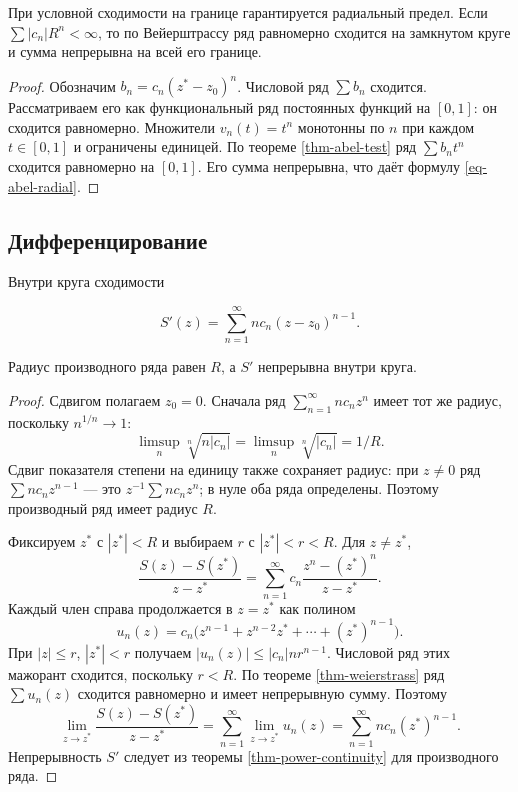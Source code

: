 При условной сходимости на границе гарантируется радиальный предел. Если \(\sum|c_n|R^n<\infty\), то по Вейерштрассу ряд равномерно сходится на замкнутом круге и сумма непрерывна на всей его границе.

\begin{proof}

Обозначим \(b_n=c_n(z^*-z_0)^n\). Числовой ряд \(\sum b_n\) сходится. Рассматриваем его как функциональный ряд постоянных функций на \([0,1]\): он сходится равномерно. Множители \(v_n(t)=t^n\) монотонны по \(n\) при каждом \(t\in[0,1]\) и ограничены единицей. По теореме \ref{thm-abel-test} ряд \(\sum b_nt^n\) сходится равномерно на \([0,1]\). Его сумма непрерывна, что даёт формулу \eqref{eq-abel-radial}.

\end{proof}

\subsection{Дифференцирование}\label{sec-power-series-03-1}

\begin{theorem}\label{thm-power-derivative}

Внутри круга сходимости

\begin{equation}
S'(z)=\sum_{n=1}^\infty nc_n(z-z_0)^{n-1}.
\label{eq-power-derivative}
\end{equation}

Радиус производного ряда равен \(R\), а \(S'\) непрерывна внутри круга.

\end{theorem}

\begin{proof}

Сдвигом полагаем \(z_0=0\). Сначала ряд \(\sum_{n=1}^\infty nc_nz^n\) имеет тот же радиус, поскольку \(n^{1/n}\to1\): \[
\limsup_n\sqrt[n]{n|c_n|}=\limsup_n\sqrt[n]{|c_n|}=1/R.
\] Сдвиг показателя степени на единицу также сохраняет радиус: при \(z\ne0\) ряд \(\sum nc_nz^{n-1}\) --- это \(z^{-1}\sum nc_nz^n\); в нуле оба ряда определены. Поэтому производный ряд имеет радиус \(R\).

Фиксируем \(z^*\) с \(|z^*|<R\) и выбираем \(r\) с \(|z^*|<r<R\). Для \(z\ne z^*\), \[
\frac{S(z)-S(z^*)}{z-z^*}
=\sum_{n=1}^\infty c_n\frac{z^n-(z^*)^n}{z-z^*}.
\] Каждый член справа продолжается в \(z=z^*\) как полином \[
u_n(z)=c_n\bigl(z^{n-1}+z^{n-2}z^*+\cdots+(z^*)^{n-1}\bigr).
\] При \(|z|\le r\), \(|z^*|<r\) получаем \(|u_n(z)|\le|c_n|nr^{n-1}\). Числовой ряд этих мажорант сходится, поскольку \(r<R\). По теореме \ref{thm-weierstrass} ряд \(\sum u_n(z)\) сходится равномерно и имеет непрерывную сумму. Поэтому \[
\lim_{z\to z^*}\frac{S(z)-S(z^*)}{z-z^*}
=\sum_{n=1}^\infty\lim_{z\to z^*}u_n(z)
=\sum_{n=1}^\infty nc_n(z^*)^{n-1}.
\] Непрерывность \(S'\) следует из теоремы \ref{thm-power-continuity} для производного ряда.

\end{proof}

